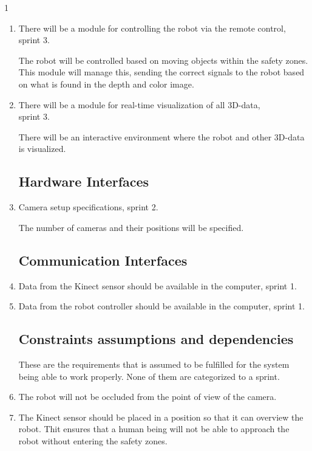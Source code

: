 1\documentclass[10pt,a4paper]{article}
\begin{document}
\begin{enumerate}
\item There will be a module for controlling the robot via the remote control, sprint 3.

{\addtolength{\leftskip}{5mm}The robot will be controlled based on moving objects within the safety zones. This module will manage this, sending the correct signals to the robot based on what is found in the depth and color image.
\par}

\item There will be a module for real-time visualization of all 3D-data,\\ sprint 3.

{\addtolength{\leftskip}{5mm}There will be an interactive environment where the robot and other 3D-data is visualized.\par}

\subsection{Hardware Interfaces}

\item Camera setup specifications, sprint 2.

{\addtolength{\leftskip}{5mm} The number of cameras and their positions will be specified.\par}

\subsection{Communication Interfaces}

\item Data from the Kinect sensor should be available in the computer, sprint 1.
\item Data from the robot controller should be available in the computer, sprint 1.

\subsection{Constraints assumptions and dependencies}
These are the requirements that is assumed to be fulfilled for the system being able to work properly. None of them are categorized to a sprint.

\item The robot will not be occluded from the point of view of the camera.

\item The Kinect sensor should be placed in a position so that it can overview the robot. Thit ensures that a human being will not be able to approach the robot without entering the safety zones.


\end{enumerate}
\end{document}
